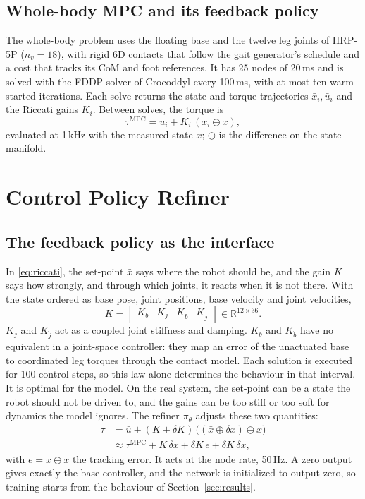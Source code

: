 \documentclass[conference]{IEEEtran}
\newcommand{\R}{\mathbb{R}}
\newcommand{\mpc}{\mathrm{MPC}}
\newcommand{\xb}{\bar{x}}
\newcommand{\ub}{\bar{u}}
\begin{document}
\subsection{Whole-body MPC and its feedback policy}
The whole-body problem uses the floating base and the twelve leg joints of HRP-5P \cite{kaneko2019hrp5p} ($n_v=18$), with rigid 6D contacts that follow the gait generator's schedule and a cost that tracks its CoM and foot references.
It has 25 nodes of 20\,ms and is solved with the FDDP solver of Crocoddyl \cite{mastalli2020crocoddyl} every 100\,ms, with at most ten warm-started iterations.
Each solve returns the state and torque trajectories $\xb_i,\ub_i$ and the Riccati gains $K_i$.
Between solves, the torque is
\begin{equation}
\tau^{\mpc}=\ub_i+K_i\,(\xb_i\ominus x),
\label{eq:riccati}
\end{equation}
evaluated at 1\,kHz with the measured state $x$; $\ominus$ is the difference on the state manifold.

\section{Control Policy Refiner}
\label{sec:method}

\subsection{The feedback policy as the interface}
In \eqref{eq:riccati}, the set-point $\xb$ says where the robot should be, and the gain $K$ says how strongly, and through which joints, it reacts when it is not there.
With the state ordered as base pose, joint positions, base velocity and joint velocities,
\begin{equation}
K=\begin{bmatrix}K_{b}&K_{j}&K_{\dot b}&K_{\dot j}\end{bmatrix}\in\R^{12\times36}.
\label{eq:kpart}
\end{equation}
$K_j$ and $K_{\dot j}$ act as a coupled joint stiffness and damping.
$K_b$ and $K_{\dot b}$ have no equivalent in a joint-space controller: they map an error of the unactuated base to coordinated leg torques through the contact model.
Each solution is executed for 100 control steps, so this law alone determines the behaviour in that interval.
It is optimal for the model.
On the real system, the set-point can be a state the robot should not be driven to, and the gains can be too stiff or too soft for dynamics the model ignores.
The refiner $\pi_\theta$ adjusts these two quantities:
\begin{align}
\tau&=\ub+(K+\delta K)\,\big((\xb\oplus\delta x)\ominus x\big)\nonumber\\
&\approx\tau^{\mpc}+K\,\delta x+\delta K\,e+\delta K\,\delta x,
\label{eq:l2}
\end{align}
with $e=\xb\ominus x$ the tracking error.
It acts at the node rate, 50\,Hz.
A zero output gives exactly the base controller, and the network is initialized to output zero, so training starts from the behaviour of Section~\ref{sec:results}.
\end{document}
